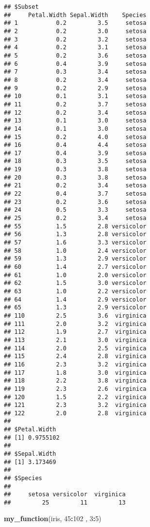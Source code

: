\documentclass[
]{article}
\newenvironment{Shaded}{\begin{snugshade}}{\end{snugshade}}
\newcommand{\DecValTok}[1]{\textcolor[rgb]{0.00,0.00,0.81}{#1}}
\newcommand{\KeywordTok}[1]{\textcolor[rgb]{0.13,0.29,0.53}{\textbf{#1}}}
\newcommand{\NormalTok}[1]{#1}
\newcommand{\OperatorTok}[1]{\textcolor[rgb]{0.81,0.36,0.00}{\textbf{#1}}}
\begin{document}
\begin{verbatim}
## $Subset
##     Petal.Width Sepal.Width    Species
## 1           0.2         3.5     setosa
## 2           0.2         3.0     setosa
## 3           0.2         3.2     setosa
## 4           0.2         3.1     setosa
## 5           0.2         3.6     setosa
## 6           0.4         3.9     setosa
## 7           0.3         3.4     setosa
## 8           0.2         3.4     setosa
## 9           0.2         2.9     setosa
## 10          0.1         3.1     setosa
## 11          0.2         3.7     setosa
## 12          0.2         3.4     setosa
## 13          0.1         3.0     setosa
## 14          0.1         3.0     setosa
## 15          0.2         4.0     setosa
## 16          0.4         4.4     setosa
## 17          0.4         3.9     setosa
## 18          0.3         3.5     setosa
## 19          0.3         3.8     setosa
## 20          0.3         3.8     setosa
## 21          0.2         3.4     setosa
## 22          0.4         3.7     setosa
## 23          0.2         3.6     setosa
## 24          0.5         3.3     setosa
## 25          0.2         3.4     setosa
## 55          1.5         2.8 versicolor
## 56          1.3         2.8 versicolor
## 57          1.6         3.3 versicolor
## 58          1.0         2.4 versicolor
## 59          1.3         2.9 versicolor
## 60          1.4         2.7 versicolor
## 61          1.0         2.0 versicolor
## 62          1.5         3.0 versicolor
## 63          1.0         2.2 versicolor
## 64          1.4         2.9 versicolor
## 65          1.3         2.9 versicolor
## 110         2.5         3.6  virginica
## 111         2.0         3.2  virginica
## 112         1.9         2.7  virginica
## 113         2.1         3.0  virginica
## 114         2.0         2.5  virginica
## 115         2.4         2.8  virginica
## 116         2.3         3.2  virginica
## 117         1.8         3.0  virginica
## 118         2.2         3.8  virginica
## 119         2.3         2.6  virginica
## 120         1.5         2.2  virginica
## 121         2.3         3.2  virginica
## 122         2.0         2.8  virginica
## 
## $Petal.Width
## [1] 0.9755102
## 
## $Sepal.Width
## [1] 3.173469
## 
## $Species
## 
##     setosa versicolor  virginica 
##         25         11         13
\end{verbatim}

\begin{Shaded}
\begin{Highlighting}[]
\KeywordTok{my_function}\NormalTok{(iris, }\DecValTok{45}\OperatorTok{:}\DecValTok{102}\NormalTok{ , }\DecValTok{3}\OperatorTok{:}\DecValTok{5}\NormalTok{)}
\end{Highlighting}
\end{Shaded}
\end{document}
